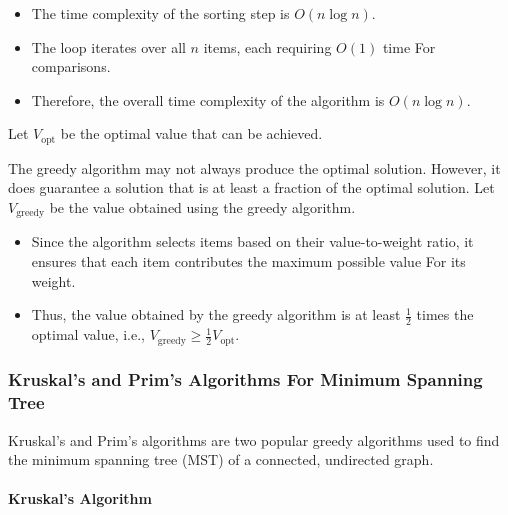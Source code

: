 \documentclass[12pt]{book} %
\begin{document}
\begin{itemize}
    \item The time complexity of the sorting step is $O(n \log n)$.
    \item The loop iterates over all $n$ items, each requiring $O(1)$ time For comparisons.
    \item Therefore, the overall time complexity of the algorithm is $O(n \log n)$.
\end{itemize}

Let $V_{\text{opt}}$ be the optimal value that can be achieved.

The greedy algorithm may not always produce the optimal solution. However, it does guarantee a solution that is at least a fraction of the optimal solution. Let $V_{\text{greedy}}$ be the value obtained using the greedy algorithm.

\begin{itemize}
    \item Since the algorithm selects items based on their value-to-weight ratio, it ensures that each item contributes the maximum possible value For its weight.
    \item Thus, the value obtained by the greedy algorithm is at least $\frac{1}{2}$ times the optimal value, i.e., $V_{\text{greedy}} \geq \frac{1}{2} V_{\text{opt}}$.
\end{itemize}
\FloatBarrier %

\subsubsection{Kruskal's and Prim's Algorithms For Minimum Spanning Tree}

Kruskal's and Prim's algorithms are two popular greedy algorithms used to find the minimum spanning tree (MST) of a connected, undirected graph. 

\paragraph{Kruskal's Algorithm}
\end{document}
